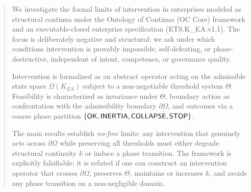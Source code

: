 ﻿\begin{abstract}
We investigate the formal limits of intervention in enterprises modeled as
structural continua under the Ontology of Continua (OC Core) framework and an
executable-closed enterprise specification (ETS.K\_EA.v1.1).
The focus is deliberately negative and structural: we ask under which conditions
intervention is provably impossible, self-defeating, or phase-destructive,
independent of intent, competence, or governance quality.

Intervention is formalized as an abstract operator acting on the admissible state
space $\Omega(K_{EA})$ subject to a non-negotiable threshold system $\Theta$.
Feasibility is characterized as invariance under $\Theta$, boundary action as
confrontation with the admissibility boundary $\partial\Omega$, and outcomes via
a coarse phase partition
$\{\OK,\INERTIA,\COLLAPSE,\STOP\}$.

The main results establish \emph{no-free} limits:
any intervention that genuinely acts across $\partial\Omega$ while preserving
all thresholds must either degrade structural continuity $k$ or induce a phase
transition.
The framework is explicitly falsifiable: it is refuted if one can construct an
intervention operator that crosses $\partial\Omega$, preserves $\Theta$, maintains
or increases $k$, and avoids any phase transition on a non-negligible domain.
\end{abstract}
